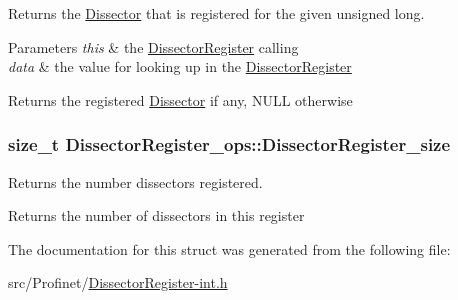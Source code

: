 Returns the \hyperlink{struct_dissector}{Dissector} that is registered for the given unsigned long. 


\begin{DoxyParams}{Parameters}
{\em this} & the \hyperlink{struct_dissector_register}{Dissector\-Register} calling \\
\hline
{\em data} & the value for looking up in the \hyperlink{struct_dissector_register}{Dissector\-Register}\\
\hline
\end{DoxyParams}
\begin{DoxyReturn}{Returns}
the registered \hyperlink{struct_dissector}{Dissector} if any, N\-U\-L\-L otherwise 
\end{DoxyReturn}
\hypertarget{struct_dissector_register__ops_abe25ddc2aed0125710137695861079e6}{
\subsubsection[{Dissector\-Register\-\_\-size}]{\setlength{\rightskip}{0pt plus 5cm}size\-\_\-t Dissector\-Register\-\_\-ops\-::\-Dissector\-Register\-\_\-size}}\label{struct_dissector_register__ops_abe25ddc2aed0125710137695861079e6}


Returns the number dissectors registered. 

\begin{DoxyReturn}{Returns}
the number of dissectors in this register 
\end{DoxyReturn}


The documentation for this struct was generated from the following file\-:\begin{DoxyCompactItemize}
\item 
src/\-Profinet/\hyperlink{_dissector_register-int_8h}{Dissector\-Register-\/int.\-h}\end{DoxyCompactItemize}
